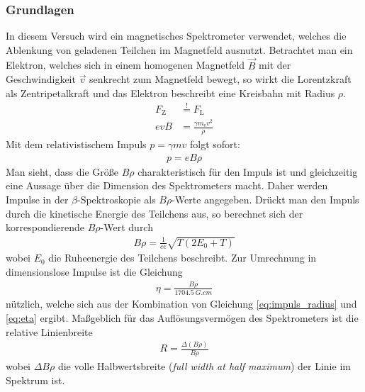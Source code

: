 \documentclass[11pt, a4paper]{article}
\numberwithin{equation}{section}
\begin{document}
\subsubsection{Grundlagen}
In diesem Versuch wird ein magnetisches Spektrometer verwendet, welches die Ablenkung von geladenen Teilchen im Magnetfeld ausnutzt.
Betrachtet man ein Elektron, welches sich in einem homogenen Magnetfeld $\vec{B}$ mit der Geschwindigkeit $\vec{v}$ senkrecht zum Magnetfeld bewegt, so wirkt die Lorentzkraft als Zentripetalkraft und das Elektron beschreibt eine Kreisbahn mit Radius $\rho$.
\begin{align}
	F_\mathrm{Z} &\stackrel{!}{=} F_\mathrm{L} \nonumber\\
	e v B &= \frac{\gamma m_\mathrm{e} v^2}{\rho}
\end{align}
Mit dem relativistischem Impuls $p = \gamma m v$ folgt sofort:
\begin{align}
	p = e B \rho
	\label{eq:impuls_radius}
\end{align}
Man sieht, dass die Größe $B \rho$ charakteristisch für den Impuls ist und gleichzeitig eine Aussage über die Dimension des Spektrometers macht.
Daher werden Impulse in der $\beta$-Spektroskopie als $B \rho$-Werte angegeben.
Drückt man den Impuls durch die kinetische Energie des Teilchens aus, so berechnet sich der korrespondierende $B \rho$-Wert durch
\begin{align}
B \rho = \frac{1}{c e} \sqrt{T \left( 2 E_0 + T \right)}
\label{eq:b_rho}
\end{align}
wobei $E_0$ die Ruheenergie des Teilchens beschreibt.
Zur Umrechnung in dimensionslose Impulse ist die Gleichung
\begin{align}
	\eta = \frac{B \rho}{\SI{1704.5}{G.cm}}
	\label{eq:brho_to_eta}
\end{align}
nützlich, welche sich aus der Kombination von Gleichung \eqref{eq:impuls_radius} und \eqref{eq:eta} ergibt.
Maßgeblich für das Auflösungsvermögen des Spektrometers ist die relative Linienbreite
\begin{align}
	R = \frac{\Delta (B \rho)}{B \rho}
	\label{eq:rel_linienbreite}
\end{align}
wobei $\Delta B \rho$ die volle Halbwertsbreite (\emph{full width at half maximum}) der Linie im Spektrum ist.
\end{document}
